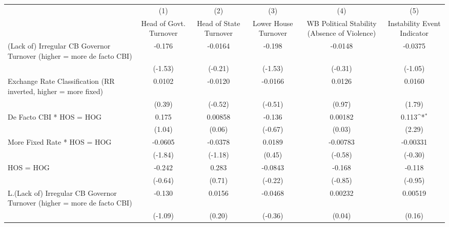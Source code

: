 {
\def\sym#1{\ifmmode^{#1}\else\(^{#1}\)\fi}
\begin{tabular}{l*{5}{c}}
\hline\hline
                &\multicolumn{1}{c}{(1)}&\multicolumn{1}{c}{(2)}&\multicolumn{1}{c}{(3)}&\multicolumn{1}{c}{(4)}&\multicolumn{1}{c}{(5)}\\
                &\multicolumn{1}{c}{Head of Govt. Turnover}&\multicolumn{1}{c}{Head of State Turnover}&\multicolumn{1}{c}{Lower House Turnover}&\multicolumn{1}{c}{WB Political Stability (Absence of Violence)}&\multicolumn{1}{c}{Instability Event Indicator}\\
\hline
(Lack of) Irregular CB Governor Turnover (higher = more de facto CBI)&   -0.176         &  -0.0164         &   -0.198         &  -0.0148         &  -0.0375         \\
                &  (-1.53)         &  (-0.21)         &  (-1.53)         &  (-0.31)         &  (-1.05)         \\
[1em]
Exchange Rate Classification (RR inverted, higher = more fixed)&   0.0102         &  -0.0120         &  -0.0166         &   0.0126         &   0.0160         \\
                &   (0.39)         &  (-0.52)         &  (-0.51)         &   (0.97)         &   (1.79)         \\
[1em]
De Facto CBI * HOS = HOG&    0.175         &  0.00858         &   -0.136         &  0.00182         &    0.113\sym{*}  \\
                &   (1.04)         &   (0.06)         &  (-0.67)         &   (0.03)         &   (2.29)         \\
[1em]
More Fixed Rate * HOS = HOG&  -0.0605         &  -0.0378         &   0.0189         & -0.00783         & -0.00331         \\
                &  (-1.84)         &  (-1.18)         &   (0.45)         &  (-0.58)         &  (-0.30)         \\
[1em]
HOS = HOG       &   -0.242         &    0.283         &  -0.0843         &   -0.168         &   -0.118         \\
                &  (-0.64)         &   (0.71)         &  (-0.22)         &  (-0.85)         &  (-0.95)         \\
[1em]
L.(Lack of) Irregular CB Governor Turnover (higher = more de facto CBI)&   -0.130         &   0.0156         &  -0.0468         &  0.00232         &  0.00519         \\
                &  (-1.09)         &   (0.20)         &  (-0.36)         &   (0.04)         &   (0.16)         \\

\end{tabular}}
